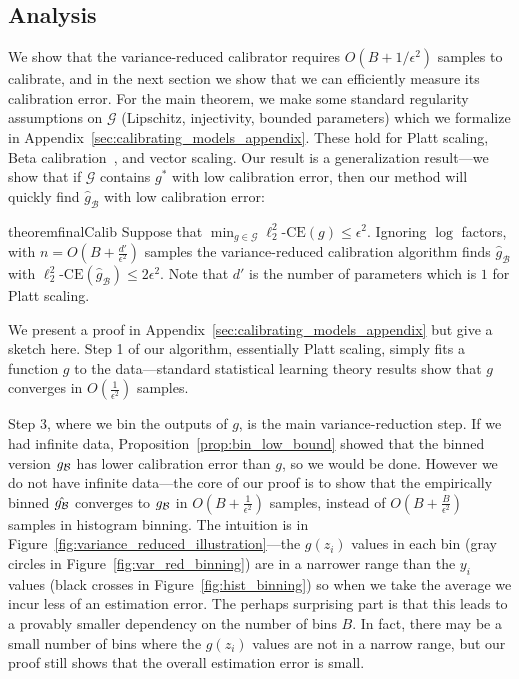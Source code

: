 

\subsection{Analysis}

We show that the variance-reduced calibrator requires $O(B + 1/\epsilon^2)$ samples to calibrate, and in the next section we show that we can efficiently measure its calibration error. For the main theorem, we make some standard regularity assumptions on $\mathcal{G}$ (Lipschitz, injectivity, bounded parameters) which we formalize in Appendix~\ref{sec:calibrating_models_appendix}. These hold for Platt scaling, Beta calibration~\cite{kull2017sigmoids}, and vector scaling. Our result is a generalization result---we show that if $\mathcal{G}$ contains $g^*$ with low calibration error, then our method will quickly find $\hat{g}_{\mathcal{B}}$ with low calibration error:

\begin{restatable}{theorem}{finalCalib}
\label{thm:final-calib}
Suppose that $\min_{g \in \mathcal{G}}\ell_2^2\mbox{-CE}(g) \leq \epsilon^2$.
  Ignoring $\log$ factors, with $n = O(B + \frac{d'}{\epsilon^2})$ samples the variance-reduced calibration algorithm finds $\hat{g}_{\mathcal{B}}$ with $\ell_2^2\mbox{-CE}(\hat{g}_{\mathcal{B}}) \leq 2 \epsilon^2$. Note that $d'$ is the number of parameters which is $1$ for Platt scaling.
\end{restatable}

We present a proof in Appendix~\ref{sec:calibrating_models_appendix} but give a sketch here. Step 1 of our algorithm, essentially Platt scaling, simply fits a function $g$ to the data---standard statistical learning theory results show that $g$ converges in $O(\frac{1}{\epsilon^2})$ samples.

Step 3, where we bin the outputs of $g$, is the main variance-reduction step. If we had infinite data, Proposition~\ref{prop:bin_low_bound} showed that the binned version $g_{\mathcal{B}{}}$ has lower calibration error than $g$, so we would be done. However we do not have infinite data---the core of our proof is to show that the empirically binned $\hat{g_{\mathcal{B}{}}}$ converges to $g_{\mathcal{B}{}}$ in $O(B + \frac{1}{\epsilon^2})$ samples, instead of $O(B + \frac{B}{\epsilon^2})$ samples in histogram binning. The intuition is in Figure~\ref{fig:variance_reduced_illustration}---the $g(z_i)$ values in each bin (gray circles in Figure~\ref{fig:var_red_binning}) are in a narrower range than the $y_i$ values (black crosses in Figure~\ref{fig:hist_binning}) so when we take the average we incur less of an estimation error. The perhaps surprising part is that this leads to a provably smaller dependency on the number of bins $B$. In fact, there may be a small number of bins where the $g(z_i)$ values are not in a narrow range, but our proof still shows that the overall estimation error is small.

